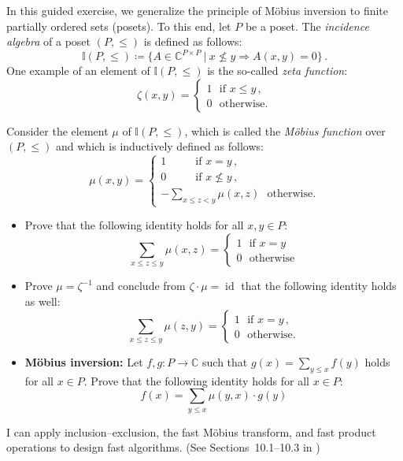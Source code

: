 \documentclass[english]{uebung_cs}
\begin{document}
\begin{exercise}%
  \label{posets}
  In this guided exercise, we generalize the principle of Möbius inversion to finite partially ordered sets (posets). To this end, let $P$ be a poset. The \emph{incidence algebra} of a poset $(P,\leq)$ is defined as follows:
  \[\mathbb{I}(P,\leq) \coloneqq \{A \in \mathbb{C}^{P\times P} ~|~ x \nleq y \Rightarrow A(x,y)=0\} \,.\]
  One example of an element of $\mathbb{I}(P,\leq)$ is the so-called \emph{zeta function}:
  \[\zeta(x,y)=\begin{cases} 1 ~~~\text{if } x \leq y\,,\\0~~~\text{otherwise.} \end{cases} \]

  Consider the element $\mu$ of $\mathbb{I}(P,\leq)$, which is called the \emph{Möbius function} over $(P,\leq)$ and which is inductively defined as follows:
  \[\mu(x,y)=\begin{cases}
      1 ~~~~~~~~~~~~\text{if } x = y\,,\\0~~~~~~~~~~~~\text{if } x \nleq y\,,\\ -\sum_{x \leq z < y}\mu(x,z)~~~\text{otherwise.} \end{cases} \]
  \begin{itemize}
    \item Prove that the following identity holds for all $x,y \in P$:
          \[\sum_{x\leq z\leq y}\mu(x,z)=\begin{cases} 1 ~~~\text{if } x = y\\0~~~\text{otherwise} \end{cases} \]
    \item Prove $\mu = \zeta^{-1}$ and conclude from $\zeta\cdot \mu = \operatorname{id}$ that the following identity holds as well:
          \[\sum_{x\leq z\leq y}\mu(z,y)=\begin{cases} 1 ~~~\text{if } x = y\,,\\0~~~\text{otherwise.} \end{cases} \]
    \item \textbf{Möbius inversion:} Let $f,g \colon P \to \mathbb{C}$ such that $g(x) = \sum_{y\leq x} f(y)$ holds for all $x \in P$. Prove that the following identity holds for all $x \in P$:
          \[f(x) = \sum_{y \leq x} \mu(y,x) \cdot g(y) \]
  \end{itemize}
\end{exercise}


\begin{skill}
  I can apply inclusion--exclusion, the fast Möbius transform, and fast product operations to design fast algorithms. \normalfont (See Sections~10.1--10.3 in \cygan{})
\end{skill}
\end{document}
